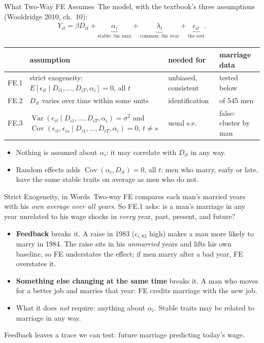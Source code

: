 \documentclass[aspectratio=169,11pt,xcolor=dvipsnames]{beamer}
\newcommand{\srcp}[1]{{\scriptsize\color{gray}(#1)}}
\DeclareMathOperator{\Cov}{Cov}
\DeclareMathOperator{\Var}{Var}
\newcommand{\E}{E}
\newcommand{\core}{\,\raisebox{0.6pt}{\textcolor{corestar}{$\bigstar$}}}
\begin{document}
\begin{frame}{What Two-Way FE Assumes\core}
The model, with the textbook's three assumptions \srcp{Wooldridge 2010, ch.~10}:
\vskip-6pt
\begin{align*}
  Y_{it} = \beta D_{it} + \underbrace{\alpha_i}_{\text{stable: the man}}
         + \underbrace{\lambda_t}_{\text{common: the year}}
         + \underbrace{\epsilon_{it}}_{\text{the rest}} .
\end{align*}
\vskip-4pt
\begin{center}\footnotesize
\renewcommand{\arraystretch}{1.1}
\begin{tabular}{@{}l>{\raggedright\arraybackslash}p{5.4cm}l>{\raggedright\arraybackslash}p{2.6cm}@{}}
\toprule
 & assumption & needed for & marriage data \\
\midrule
FE.1 & strict exogeneity: $\E[\epsilon_{it}\mid D_{i1},\dots,D_{iT},\alpha_i] = 0$, all $t$
  & unbiased, consistent & tested below \\
FE.2 & $D_{it}$ varies over time within some units & identification & 310 of 545 men \\
FE.3 & $\Var(\epsilon_{it}\mid D_{i1},\dots,D_{iT},\alpha_i) = \sigma^2$ and
  $\Cov(\epsilon_{it},\epsilon_{is}\mid D_{i1},\dots,D_{iT},\alpha_i) = 0$, $t \ne s$
  & usual s.e. & false: cluster by man \\
\bottomrule
\end{tabular}
\end{center}
\vskip-4pt
\begin{itemize}\itemsep2pt
  \item Nothing is assumed about $\alpha_i$: it may correlate with $D_{it}$ in any way.
  \item Random effects adds $\Cov(\alpha_i, D_{it}) = 0$, all $t$: men who marry, early
        or late, have the same stable traits on average as men who do not.
\end{itemize}
\end{frame}

\begin{frame}{Strict Exogeneity, in Words\core}
Two-way FE compares each man's married years with his \emph{own average over all years}.
So FE.1 asks: is a man's marriage in any year unrelated to his wage shocks in \emph{every}
year, past, present, and future?
\vskip4pt
\begin{itemize}\itemsep5pt
  \item \textbf{Feedback} breaks it. A raise in 1983 ($\epsilon_{i,83}$ high) makes a man
        more likely to marry in 1984. The raise sits in his \emph{unmarried} years and lifts
        his own baseline, so FE understates the effect; if men marry after a bad year,
        FE overstates it.
  \item \textbf{Something else changing at the same time} breaks it. A man who moves
        for a better job and marries that year: FE credits marriage with the new job.
  \item What it does \emph{not} require: anything about $\alpha_i$. Stable traits may be
        related to marriage in any way.
\end{itemize}
\vskip4pt
Feedback leaves a trace we can test: future marriage predicting today's wage.
\end{frame}
\end{document}
